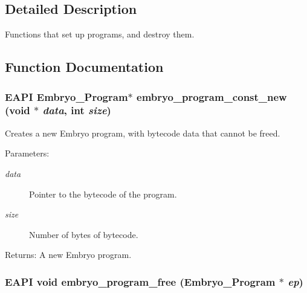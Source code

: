 \subsection{Detailed Description}
Functions that set up programs, and destroy them. 



\subsection{Function Documentation}
\hypertarget{group__Embryo__Program__Creation__Group_ge3e58565672af272e613d4fbda20c769}{
\subsubsection{\setlength{\rightskip}{0pt plus 5cm}EAPI Embryo\_\-Program$\ast$ embryo\_\-program\_\-const\_\-new (void $\ast$ {\em data}, \/  int {\em size})}}
\label{group__Embryo__Program__Creation__Group_ge3e58565672af272e613d4fbda20c769}


Creates a new Embryo program, with bytecode data that cannot be freed. 

\begin{Desc}
\item[Parameters:]
\begin{description}
\item[{\em data}]Pointer to the bytecode of the program. \item[{\em size}]Number of bytes of bytecode. \end{description}
\end{Desc}
\begin{Desc}
\item[Returns:]A new Embryo program. \end{Desc}
\hypertarget{group__Embryo__Program__Creation__Group_g2f25a71ef9f2254882c841fbd5e0e68a}{
\subsubsection{\setlength{\rightskip}{0pt plus 5cm}EAPI void embryo\_\-program\_\-free (Embryo\_\-Program $\ast$ {\em ep})}}
\label{group__Embryo__Program__Creation__Group_g2f25a71ef9f2254882c841fbd5e0e68a}


